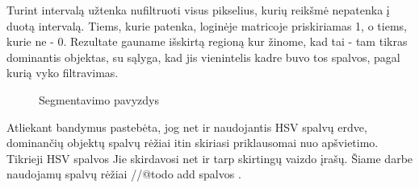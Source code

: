 \documentclass{VUMIFPSbakalaurinis}
\begin{document}
Turint intervalą užtenka nufiltruoti visus pikselius, kurių reikšmė nepatenka į duotą intervalą. Tiems, kurie patenka, loginėje matricoje priskiriamas 1, o tiems, kurie ne - 0. Rezultate gauname išskirtą regioną kur žinome, kad tai - tam tikras dominantis objektas, su sąlyga, kad jis vienintelis kadre buvo tos spalvos, pagal kurią vyko filtravimas. 
\begin{figure}[H]
	\centering
	\qquad
	\caption{Segmentavimo pavyzdys}
	\label{fig:example}
\end{figure}

Atliekant bandymus pastebėta, jog net ir naudojantis HSV spalvų erdve, dominančių objektų spalvų rėžiai itin skiriasi priklausomai nuo apšvietimo.
Tikrieji HSV spalvos Jie skirdavosi net ir tarp skirtingų vaizdo įrašų. Šiame darbe naudojamų spalvų rėžiai //@todo add spalvos .
\end{document}
